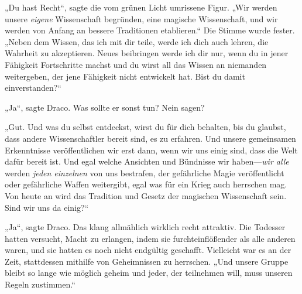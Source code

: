 „Du hast Recht“, sagte die vom grünen Licht umrissene Figur. „Wir werden unsere \emph{eigene} Wissenschaft begründen, eine magische Wissenschaft, und wir werden von Anfang an bessere Traditionen etablieren.“ Die Stimme wurde fester. „Neben dem Wissen, das ich mit dir teile, werde ich dich auch lehren, die Wahrheit zu akzeptieren. Neues beibringen werde ich dir nur, wenn du in jener Fähigkeit Fortschritte machst und du wirst all das Wissen an niemanden weitergeben, der jene Fähigkeit nicht entwickelt hat. Bist du damit einverstanden?“

„Ja“, sagte Draco. Was sollte er sonst tun? Nein sagen?

„Gut. Und was du selbst entdeckst, wirst du für dich behalten, bis du glaubst, dass andere Wissenschaftler bereit sind, es zu erfahren. Und unsere gemeinsamen Erkenntnisse veröffentlichen wir erst dann, wenn wir uns einig sind, dass die Welt dafür bereit ist. Und egal welche Ansichten und Bündnisse wir haben—\emph{wir alle} werden \emph{jeden einzelnen} von uns bestrafen, der gefährliche Magie veröffentlicht oder gefährliche Waffen weitergibt, egal was für ein Krieg auch herrschen mag. Von heute an wird das Tradition und Gesetz der magischen Wissenschaft sein. Sind wir uns da einig?“

„Ja“, sagte Draco. Das klang allmählich wirklich recht attraktiv. Die Todesser hatten versucht, Macht zu erlangen, indem sie furchteinflößender als alle anderen waren, und sie hatten es noch nicht endgültig geschafft. Vielleicht war es an der Zeit, stattdessen mithilfe von Geheimnissen zu herrschen. „Und unsere Gruppe bleibt so lange wie möglich geheim und jeder, der teilnehmen will, muss unseren Regeln zustimmen.“


